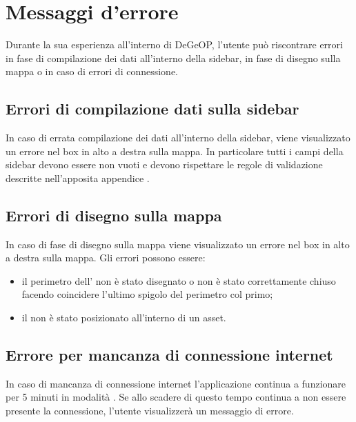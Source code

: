 \section{Messaggi d'errore}
	Durante la sua esperienza all'interno di DeGeOP, l'utente può riscontrare errori in fase di compilazione dei dati all'interno della sidebar, in fase di disegno sulla mappa o in caso di errori di connessione.

\subsection{Errori di compilazione dati sulla sidebar}
	In caso di errata compilazione dei dati all'interno della sidebar, viene visualizzato un errore nel box in alto a destra sulla mappa.
	In particolare tutti i campi della sidebar devono essere non vuoti e devono rispettare le regole di validazione descritte nell'apposita appendice .
	
\subsection{Errori di disegno sulla mappa}
	In caso di fase di disegno sulla mappa viene visualizzato un errore nel box in alto a destra sulla mappa. Gli errori possono essere:
	\begin{itemize}
		\item il perimetro dell' non è stato disegnato o non è stato correttamente chiuso facendo coincidere l'ultimo spigolo del perimetro col primo;
		\item il  non è stato posizionato all'interno di un asset.
	\end{itemize}


\subsection{Errore per mancanza di connessione internet}
	In caso di mancanza di connessione internet l'applicazione continua a funzionare per 5 minuti in modalità . Se allo scadere di questo tempo continua a non essere presente la connessione, l'utente visualizzerà un messaggio di errore.

